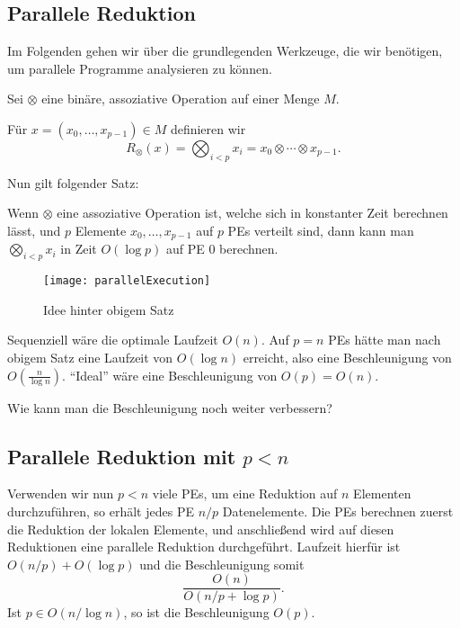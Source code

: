 \subsection{Parallele Reduktion}

Im Folgenden gehen wir über die grundlegenden Werkzeuge, die wir benötigen, um parallele Programme analysieren zu können.

\begin{definition}[Reduktion]
  Sei \( \otimes \) eine binäre, assoziative Operation auf einer Menge \( M \).

  Für \( x = (x_0,\dots,x_{p-1}) \in M \) definieren wir
  \begin{equation*}
    R_\otimes(x) = \bigotimes_{i < p}x_i = x_0 \otimes \cdots \otimes x_{p-1}\text{.}
  \end{equation*}
\end{definition}

Nun gilt folgender Satz:

\begin{theorem}
  Wenn \( \otimes \) eine assoziative Operation ist, welche sich in konstanter Zeit berechnen lässt, und \( p \) Elemente \( x_0,\dots,x_{p-1} \) auf \( p \) PEs verteilt sind, dann kann man \( \bigotimes_{i < p}x_i \) in Zeit \( O(\log p) \) auf PE \( 0 \) berechnen. 
\end{theorem}

\begin{figure}[H]
  \texttt{[image: parallelExecution]}
  \caption{Idee hinter obigem Satz}
\end{figure}

Sequenziell wäre die optimale Laufzeit \( O(n) \). Auf \( p = n \) PEs hätte man nach obigem Satz eine Laufzeit von \( O(\log n) \) erreicht, also eine Beschleunigung von \( O\left( \frac{n}{\log n} \right) \). ``Ideal'' wäre eine Beschleunigung von \( O(p) = O(n) \).

Wie kann man die Beschleunigung noch weiter verbessern?

\subsection{Parallele Reduktion mit \( p < n \)}

Verwenden wir nun \( p < n \) viele PEs, um eine Reduktion auf \( n \) Elementen durchzuführen, so erhält jedes PE \( n/p \) Datenelemente. Die PEs berechnen zuerst die Reduktion der lokalen Elemente, und anschließend wird auf diesen Reduktionen eine parallele Reduktion durchgeführt.
Laufzeit hierfür ist \( O(n/p) + O(\log p) \) und die Beschleunigung somit
\begin{equation*}
  \frac{O(n)}{O(n/p + \log p)}\text{.}
\end{equation*}
Ist \( p \in O(n/\log n) \), so ist die Beschleunigung \( O(p) \).

